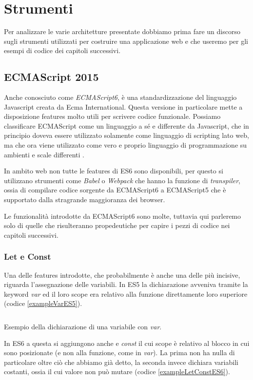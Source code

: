 \chapter{Strumenti}
Per analizzare le varie architetture presentate dobbiamo prima fare un discorso sugli strumenti utilizzati per costruire una applicazione web e che useremo per gli esempi di codice dei capitoli successivi.

\section{ECMAScript 2015}
Anche conosciuto come \textit{ECMAScript6}, è una standardizzazione del linguaggio Javascript creata da Ecma International. Questa versione in particolare mette a disposizione features molto utili per scrivere codice funzionale. Possiamo classificare ECMAScript come un linguaggio a sé e differente da Javascript, che in principio doveva essere utilizzato solamente come linguaggio di scripting lato web, ma che ora viene utilizzato come vero e proprio linguaggio di programmazione su ambienti e scale differenti \cite{ECMAScriptDocumentation}.
 
In ambito web non tutte le features di ES6 sono disponibili, per questo si utilizzano strumenti come \textit{Babel} o \textit{Webpack} che hanno la funzione di \textit{transpiler}, ossia di compilare codice sorgente da ECMAScript6 a ECMAScript5 che è supportato dalla stragrande maggioranza dei browser.

Le funzionalità introdotte da ECMAScript6 sono molte, tuttavia qui parleremo solo di quelle che risulteranno propedeutiche per capire i pezzi di codice nei capitoli successivi.

\subsection{Let e Const}
Una delle features introdotte, che probabilmente è anche una delle più incisive, riguarda l'assegnazione delle variabili. In ES5 la dichiarazione avveniva tramite la keyword \textit{var} ed il loro scope era relativo alla funzione direttamente loro superiore (codice \ref{exampleVarES5}).
 
\begin{listing}[ht]
\inputminted{Javascript}{sources/exampleVarES5.js}
\caption{Esempio della dichiarazione di una variabile con \textit{var}.}
\label{exampleVarES5}
\end{listing}

\noindent
In ES6 a questa si aggiungono anche  e \textit{const} il cui scope è relativo al blocco in cui sono posizionate (e non alla funzione, come in \textit{var}). La prima non ha nulla di particolare oltre ciò che abbiamo già detto, la seconda invece dichiara variabili costanti, ossia il cui valore non può mutare (codice \ref{exampleLetConstES6}).

